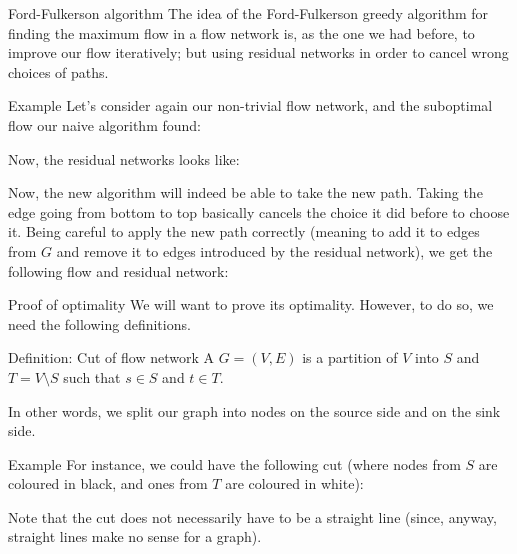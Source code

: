 \documentclass[a4paper]{article}
\begin{document}
\begin{parag}{Ford-Fulkerson algorithm}
    The idea of the Ford-Fulkerson greedy algorithm for finding the maximum flow in a flow network is, as the one we had before, to improve our flow iteratively; but using residual networks in order to cancel wrong choices of paths.

    \begin{subparag}{Example}
        Let's consider again our non-trivial flow network, and the suboptimal flow our naive algorithm found:

        Now, the residual networks looks like:

        Now, the new algorithm will indeed be able to take the new path. Taking the edge going from bottom to top basically cancels the choice it did before to choose it. Being careful to apply the new path correctly (meaning to add it to edges from $G$ and remove it to edges introduced by the residual network), we get the following flow and residual network:
    \end{subparag}

    \begin{subparag}{Proof of optimality}
        We will want to prove its optimality. However, to do so, we need the following definitions.
    \end{subparag}
\end{parag}

\begin{parag}{Definition: Cut of flow network}
    A  $G = \left(V, E\right)$ is a partition of $V$ into $S$ and $T = V \setminus S$ such that $s \in S$ and $t \in T$.

    In other words, we split our graph into nodes on the source side and on the sink side.
    
    \begin{subparag}{Example}
        For instance, we could  have the following cut (where nodes from $S$ are  coloured in black, and ones from $T$ are coloured in white):

        Note that the cut does not necessarily have to be a straight line (since, anyway, straight lines make no sense for a graph).
    \end{subparag}
    
\end{parag}
\end{document}
